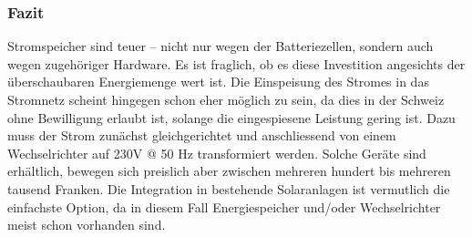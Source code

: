 \subsubsection{Fazit}
Stromspeicher sind teuer – nicht nur wegen der Batteriezellen, sondern auch wegen zugehöriger Hardware. Es ist fraglich, ob es diese Investition angesichts der überschaubaren Energiemenge wert ist. 
Die Einspeisung des Stromes in das Stromnetz scheint hingegen schon eher möglich zu sein, da dies in der Schweiz ohne Bewilligung erlaubt ist, solange die eingespiesene Leistung gering ist. Dazu muss der Strom zunächst gleichgerichtet und anschliessend von einem Wechselrichter auf 230\si{V} @ 50 \si{Hz} transformiert werden. Solche Geräte sind erhältlich, bewegen sich preislich aber zwischen mehreren hundert bis mehreren tausend Franken.
Die Integration in bestehende Solaranlagen ist vermutlich die einfachste Option, da in diesem Fall Energiespeicher und/oder Wechselrichter meist schon vorhanden sind.


\clearpage 





